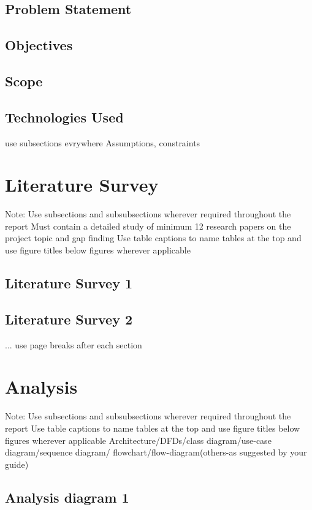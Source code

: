 \documentclass[12pt,singleside,a4paper]{article}
\begin{document}
\subsection{Problem Statement}
\subsection{Objectives}
\subsection{Scope}
\subsection{Technologies Used}
\newline 
use subsections evrywhere Assumptions, constraints
\section{Literature Survey}
Note: Use subsections and subsubsections wherever required throughout the report
\newline Must contain a detailed study of minimum 12 research papers on the project topic and gap finding
\newline Use table captions to name tables at the top and use figure titles below figures wherever applicable 
\subsection{Literature Survey 1}
\subsection{Literature Survey 2}
...
\newline use page breaks after each section


\section{Analysis}
 Note: Use subsections and subsubsections wherever required throughout the report
\newline Use table captions to name tables at the top and use figure titles below figures wherever applicable 
Architecture/DFDs/class diagram/use-case diagram/sequence diagram/ flowchart/flow-diagram(others-as suggested by your guide)
\subsection{Analysis diagram 1}
\end{document}
